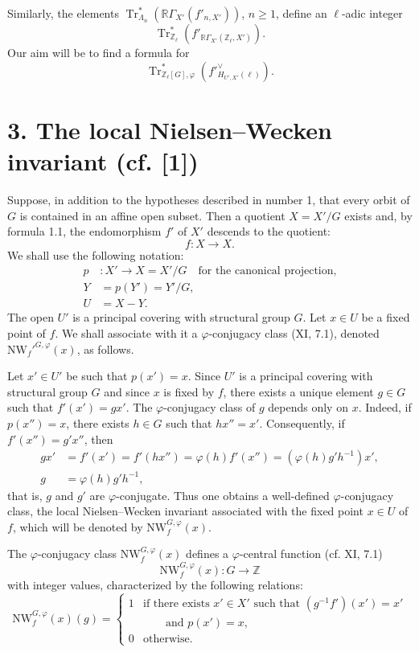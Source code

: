 \documentclass[11pt]{article}
\providecommand{\Tr}{\operatorname{Tr}}
\providecommand{\Tr}{\operatorname{Tr}}
\providecommand{\Tr}{\operatorname{Tr}}
\providecommand{\Tr}{\operatorname{Tr}}
\providecommand{\La}{\Lambda}
\providecommand{\bZ}{\mathbb Z}
\providecommand{\Tr}{\operatorname{Tr}}
\begin{document}
Similarly, the elements $\Tr^*_{\La_n}(\mathbb{R}\Gamma_{X'}(f'_{{n,X'}}))$, $n\ge1$, define an $\ell$-adic integer
\[
\Tr^*_{\bZ_\ell}(f'_{\mathbb{R}\Gamma_{X'}(\bZ_\ell,X')}).
\]
Our aim will be to find a formula for
\[
\Tr^*_{\bZ_\ell[G],\varphi}(f'^\vee_{H_{U',X'}(\ell)}).
\]

\section*{3. The local Nielsen--Wecken invariant (cf. [1])}
Suppose, in addition to the hypotheses described in number 1, that every orbit of $G$ is contained in an affine open subset. Then a quotient $X=X'/G$ exists and, by formula 1.1, the endomorphism $f'$ of $X'$ descends to the quotient:
\[
f:X\longrightarrow X .
\]
We shall use the following notation:
\begin{align*}
p &: X'\longrightarrow X=X'/G\quad \text{for the canonical projection,}\\
Y&=p(Y')=Y'/G,\\
U&=X-Y.
\end{align*}
The open $U'$ is a principal covering with structural group $G$. Let $x\in U$ be a fixed point of $f$. We shall associate with it a $\varphi$-conjugacy class (XI, 7.1), denoted $\mathrm{NW}_{f}'^{G,\varphi}(x)$, as follows.

Let $x'\in U'$ be such that $p(x')=x$. Since $U'$ is a principal covering with structural group $G$ and since $x$ is fixed by $f$, there exists a unique element $g\in G$ such that $f'(x')=gx'$. The $\varphi$-conjugacy class of $g$ depends only on $x$. Indeed, if $p(x'')=x$, there exists $h\in G$ such that $hx''=x'$. Consequently, if $f'(x'')=g'x''$, then
\begin{align*}
gx'&=f'(x')=f'(hx'')=\varphi(h)f'(x'')=(\varphi(h)g'h^{-1})x',\\
g&=\varphi(h)g'h^{-1},
\end{align*}
that is, $g$ and $g'$ are $\varphi$-conjugate. Thus one obtains a well-defined $\varphi$-conjugacy class, the local Nielsen--Wecken invariant associated with the fixed point $x\in U$ of $f$, which will be denoted by $\mathrm{NW}_{f}^{G,\varphi}(x)$.

The $\varphi$-conjugacy class $\mathrm{NW}_{f}^{G,\varphi}(x)$ defines a $\varphi$-central function (cf. XI, 7.1)
\[
\mathrm{NW}_{f}^{G,\varphi}(x):G\longrightarrow \bZ
\]
with integer values, characterized by the following relations:
\begin{equation}\tag{3.1}
\mathrm{NW}_{f}^{G,\varphi}(x)(g)=
\begin{cases}
1&\text{if there exists }x'\in X'\text{ such that }(g^{-1}f')(x')=x'\\
 &\qquad\text{and }p(x')=x,\\
0&\text{otherwise.}
\end{cases}
\end{equation}
\end{document}
